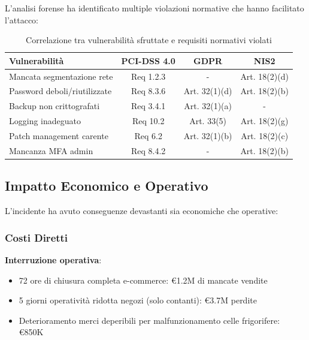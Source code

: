 L'analisi forense ha identificato multiple violazioni normative che hanno facilitato l'attacco:

\begin{table}[htbp]
\centering
\caption[Correlazione vulnerabilità-requisiti normativi violati]{Correlazione tra vulnerabilità sfruttate e requisiti normativi violati}
\label{tab:vulnerabilita_requisiti}
\small
\sffamily
\begin{tabularx}{\textwidth}{X c c c}
\toprule
\textbf{Vulnerabilità} & \textbf{PCI-DSS 4.0} & \textbf{GDPR} & \textbf{NIS2} \\
\midrule
Mancata segmentazione rete & Req 1.2.3 & - & Art. 18(2)(d) \\
Password deboli/riutilizzate & Req 8.3.6 & Art. 32(1)(d) & Art. 18(2)(b) \\
Backup non crittografati & Req 3.4.1 & Art. 32(1)(a) & - \\
Logging inadeguato & Req 10.2 & Art. 33(5) & Art. 18(2)(g) \\
Patch management carente & Req 6.2 & Art. 32(1)(b) & Art. 18(2)(c) \\
Mancanza MFA admin & Req 8.4.2 & - & Art. 18(2)(b) \\
\bottomrule
\end{tabularx}
\end{table}

\subsection{\texorpdfstring{Impatto Economico e Operativo}{4.8.2 - Impatto Economico e Operativo}}
\label{subsec:4.8.2_impatto}

L'incidente ha avuto conseguenze devastanti sia economiche che operative:

\subsubsection{\texorpdfstring{Costi Diretti}{4.8.2.1 - Costi Diretti}}

\textbf{Interruzione operativa}: 
\begin{itemize}
    \item 72 ore di chiusura completa e-commerce: €1.2M di mancate vendite
    \item 5 giorni operatività ridotta negozi (solo contanti): €3.7M perdite
    \item Deterioramento merci deperibili per malfunzionamento celle frigorifere: €850K
\end{itemize}

